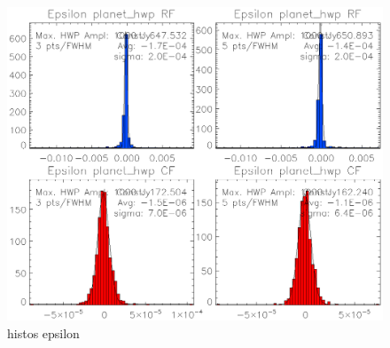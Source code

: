\begin{figure}
	\includegraphics[clip, angle=0, width=\columnwidth]{Figures/histos_epsilon.eps}
	\caption{histos epsilon}
	\label{fig:histos_epsilon}
\end{figure}
